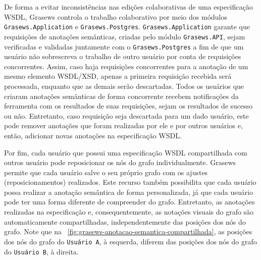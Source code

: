 De forma a evitar inconsistências nas edições colaborativas de uma especificação WSDL, Grasews controla o trabalho colaborativo por meio dos módulos \texttt{Grasews.Application} e \texttt{Grasews.Postgres}. \texttt{Grasews.Application} garante que requisições de anotações semânticas, criadas pelo módulo \texttt{Grasews.API}, sejam verificadas e validadas juntamente com o \texttt{Grasews.Postgres} a fim de que um usuário não sobrescreva o trabalho de outro usuário por conta de requisições concorrentes. Assim, caso haja requisições concorrentes para a anotação de um mesmo elemento WSDL/XSD, apenas a primeira requisição recebida será processada, enquanto que as demais serão descartadas. Todos os usuários que criaram anotações semânticas de forma concorrente recebem notificações da ferramenta com os resultados de suas requisições, sejam os resultados de sucesso ou não. Entretanto, caso requisição seja descartada para um dado usuário, este pode remover anotações que foram realizadas por ele e por outros usuários e, então, adicionar novas anotações na especificação WSDL.

Por fim, cada usuário que possui uma especificação WSDL compartilhada com outros usuário pode reposicionar os nós do grafo individualmente. Grasews permite que cada usuário salve o seu próprio grafo com os ajustes (reposicionamentos) realizados. Este recurso também possibilita que cada usuário possa realizar a anotação semântica de forma personalizada, já que cada usuário pode ter uma forma diferente de compreender do grafo. Entretanto, as anotações realizadas na especificação e, consequentemente, as notações visuais do grafo são automaticamente compartilhadas, independentemente das posições dos nós do grafo. Note que na \figurename~\ref{fig:grasews-anotacao-semantica-compartilhada}, as posições dos nós do grafo do \texttt{Usuário A}, à esquerda, diferem das posições dos nós do grafo do \texttt{Usuário B}, à direita.
